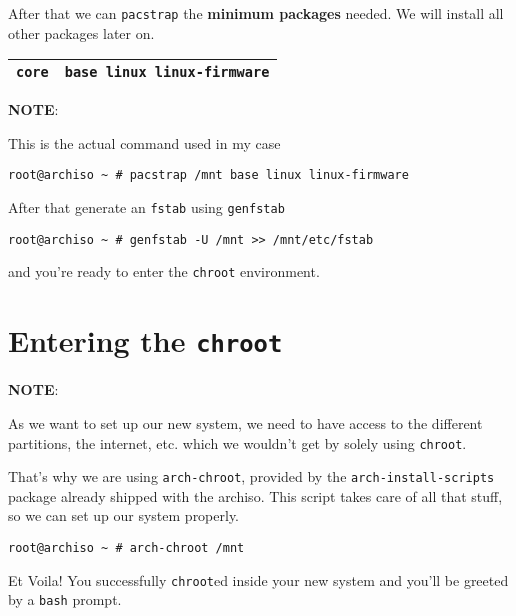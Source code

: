 \documentclass[9pt]{report}
\newcommand{\admonition}[2]{\textbf{#1}: {#2}}
\begin{document}
After that we can \texttt{pacstrap} the \textbf{minimum packages} needed.
We will install all other packages later on.


\begin{center}
\begin{tabular}{|c|c|}
\hline
\texttt{core} & \texttt{base linux linux-firmware} \\ 
\hline
\end{tabular}
\end{center}

\admonition{NOTE}{This is the actual command used in my case


}
\begin{verbatim}
root@archiso ~ # pacstrap /mnt base linux linux-firmware
\end{verbatim}
After that generate an \texttt{fstab} using \texttt{genfstab}


\begin{verbatim}
root@archiso ~ # genfstab -U /mnt >> /mnt/etc/fstab
\end{verbatim}

and you’re ready to enter the \texttt{chroot} environment.



\vfill\eject

\hypertarget{x-entering-the-chroot}{\chapter{Entering the \texttt{chroot}}}
\admonition{NOTE}{As we want to set up our new system, we need to have access to the different partitions, the internet, etc. which we wouldn’t get by solely using \texttt{chroot}.


That’s why we are using \texttt{arch-chroot}, provided by the \texttt{arch-install-scripts} package already shipped with the archiso.
This script takes care of all that stuff, so we can set up our system properly.

}
\begin{verbatim}
root@archiso ~ # arch-chroot /mnt
\end{verbatim}

Et Voila! You successfully \texttt{chroot}ed inside your new system and you’ll be greeted by a \texttt{bash} prompt.



\vfill\eject
\end{document}
